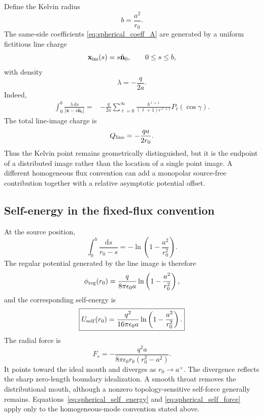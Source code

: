 \documentclass[journal,a4paper]{IEEEtran}
\begin{document}
Define the Kelvin radius
\begin{equation}
    b=\frac{a^2}{r_0}.
\end{equation}
The same-side coefficients \eqref{eq:spherical_coeff_A} are generated by a uniform fictitious line charge
\begin{equation}
    \mathbf x_{\rm im}(s)=s\hat{\mathbf n}_0,
    \qquad 0\leq s\leq b,
\end{equation}
with density
\begin{equation}
    \lambda=-\frac{q}{2a}.
    \label{eq:line_density}
\end{equation}
Indeed,
\begin{equation}
\begin{split}
\int_0^b\frac{\lambda\,\mathrm{d}s}
{|\mathbf x-s\hat{\mathbf n}_0|}
={}&-\frac{q}{2a}
\sum_{\ell=0}^{\infty}
\frac{b^{\ell+1}}{(\ell+1)r^{\ell+1}}
P_\ell(\cos\gamma).
\end{split}
\end{equation}
The total line-image charge is
\begin{equation}
    Q_{\rm line}=-\frac{qa}{2r_0}.
\end{equation}
Thus the Kelvin point remains geometrically distinguished, but it is the endpoint of a distributed image rather than the location of a single point image. A different homogeneous flux convention can add a monopolar source-free contribution together with a relative asymptotic potential offset.

\subsection{Self-energy in the fixed-flux convention}

At the source position,
\begin{equation}
    \int_0^b\frac{\mathrm{d}s}{r_0-s}
    =-\ln\left(1-\frac{a^2}{r_0^2}\right).
\end{equation}
The regular potential generated by the line image is therefore
\begin{equation}
    \phi_{\rm reg}(r_0)
    =\frac{q}{8\pi\epsilon_0 a}
    \ln\left(1-\frac{a^2}{r_0^2}\right),
\end{equation}
and the corresponding self-energy is
\begin{equation}
    \boxed{
    U_{\rm self}(r_0)
    =\frac{q^2}{16\pi\epsilon_0 a}
    \ln\left(1-\frac{a^2}{r_0^2}\right).
    }
    \label{eq:spherical_self_energy}
\end{equation}
The radial force is
\begin{equation}
    \boxed{
    F_r
    =-\frac{q^2a}
    {8\pi\epsilon_0 r_0(r_0^2-a^2)}.
    }
    \label{eq:spherical_self_force}
\end{equation}
It points toward the ideal mouth and diverges as \(r_0\rightarrow a^+\). The divergence reflects the sharp zero-length boundary idealization. A smooth throat removes the distributional mouth, although a nonzero topology-sensitive self-force generally remains. Equations~\eqref{eq:spherical_self_energy} and \eqref{eq:spherical_self_force} apply only to the homogeneous-mode convention stated above.
\end{document}
